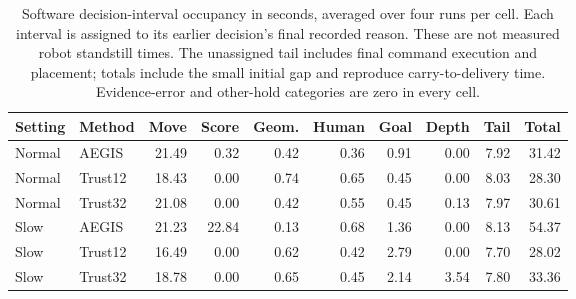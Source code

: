 \begin{table}[H]
\centering
\footnotesize
\caption{Software decision-interval occupancy in seconds, averaged over four runs per cell. Each interval is assigned to its earlier decision's final recorded reason. These are not measured robot standstill times. The unassigned tail includes final command execution and placement; totals include the small initial gap and reproduce carry-to-delivery time. Evidence-error and other-hold categories are zero in every cell.}
\label{tab:decision-occupancy}
\begin{tabular}{llrrrrrrrr}
\toprule
Setting & Method & Move & Score & Geom. & Human & Goal & Depth & Tail & Total \\
\midrule
Normal & AEGIS & 21.49 & 0.32 & 0.42 & 0.36 & 0.91 & 0.00 & 7.92 & 31.42 \\
Normal & Trust12 & 18.43 & 0.00 & 0.74 & 0.65 & 0.45 & 0.00 & 8.03 & 28.30 \\
Normal & Trust32 & 21.08 & 0.00 & 0.42 & 0.55 & 0.45 & 0.13 & 7.97 & 30.61 \\
Slow & AEGIS & 21.23 & 22.84 & 0.13 & 0.68 & 1.36 & 0.00 & 8.13 & 54.37 \\
Slow & Trust12 & 16.49 & 0.00 & 0.62 & 0.42 & 2.79 & 0.00 & 7.70 & 28.02 \\
Slow & Trust32 & 18.78 & 0.00 & 0.65 & 0.45 & 2.14 & 3.54 & 7.80 & 33.36 \\
\bottomrule
\end{tabular}
\end{table}
